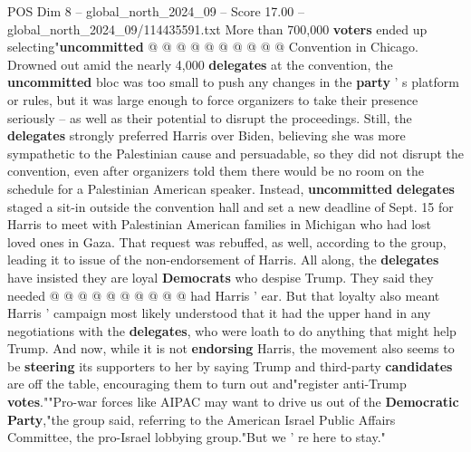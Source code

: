 \begin{textsample}{POS Dim 8 – global\_north\_2024\_09 – Score 17.00 – global\_north\_2024\_09/114435591.txt}
More than 700,000 \textbf{voters} ended up selecting"\textbf{uncommitted} @ @ @ @ @ @ @ @ @ @ Convention in Chicago.
Drowned out amid the nearly 4,000 \textbf{delegates} at the convention, the \textbf{uncommitted} bloc was too small to push any changes in the \textbf{party} ' s platform or rules, but it was large enough to force organizers to take their presence seriously -- as well as their potential to disrupt the proceedings.
Still, the \textbf{delegates} strongly preferred Harris over Biden, believing she was more sympathetic to the Palestinian cause and persuadable, so they did not disrupt the convention, even after organizers told them there would be no room on the schedule for a Palestinian American speaker.
Instead, \textbf{uncommitted} \textbf{delegates} staged a sit-in outside the convention hall and set a new deadline of Sept. 15 for Harris to meet with Palestinian American families in Michigan who had lost loved ones in Gaza.
That request was rebuffed, as well, according to the group, leading it to issue of the non-endorsement of Harris.
All along, the \textbf{delegates} have insisted they are loyal \textbf{Democrats} who despise Trump.
They said they needed @ @ @ @ @ @ @ @ @ @ had Harris ' ear.
But that loyalty also meant Harris ' campaign most likely understood that it had the upper hand in any negotiations with the \textbf{delegates}, who were loath to do anything that might help Trump.
And now, while it is not \textbf{endorsing} Harris, the movement also seems to be \textbf{steering} its supporters to her by saying Trump and third-party \textbf{candidates} are off the table, encouraging them to turn out and"register anti-Trump \textbf{votes}.""Pro-war forces like AIPAC may want to drive us out of the \textbf{Democratic} \textbf{Party},"the group said, referring to the American Israel Public Affairs Committee, the pro-Israel lobbying group."But we ' re here to stay."

\end{textsample}
